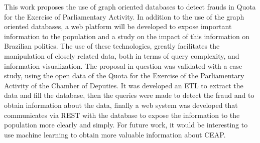 	This work proposes the use of graph oriented databases to detect frauds in Quota for the Exercise of Parliamentary Activity. In addition to the use of the graph oriented databases, a web platform will be developed to expose important information to the population and a study on the impact of this information on Brazilian politics. The use of these technologies, greatly facilitates the manipulation of closely related data, both in terms of query complexity, and information visualization. The proposal in question was validated with a case study, using the open data of the Quota for the Exercise of the Parliamentary Activity of the Chamber of Deputies. It was developed an ETL to extract the data and fill the database, then the queries were made to detect the fraud and to obtain information about the data, finally a web system was developed that communicates via REST with the database to expose the information to the population more clearly and simply. For future work, it would be interesting to use machine learning to obtain more valuable information about CEAP.